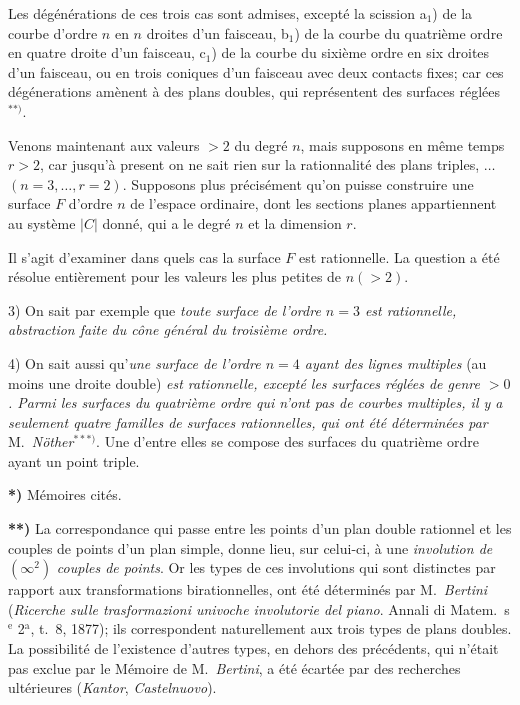 \documentclass{article}
\begin{document}
Les dégénérations de ces trois cas sont admises, excepté la scission a${}_{1}$) de la courbe d'ordre $n$ en $n$ droites d'un faisceau, b${}_{1}$) de la courbe du quatrième ordre en quatre droite d'un faisceau, c${}_{1}$) de la courbe du sixième ordre en six droites d'un faisceau, ou en trois coniques d'un faisceau avec deux contacts fixes; car ces dégénerations amènent à des plans doubles, qui représentent des surfaces réglées${}^{**)}$.

Venons maintenant aux valeurs $> 2$ du degré $n$, mais supposons en même temps $r > 2$, car jusqu'à present on ne sait rien sur la rationnalité des plans triples, $\ldots$ $(n = 3, \ldots, r = 2)$. Supposons plus précisément qu'on puisse construire une surface $F$ d'ordre $n$ de l'espace ordinaire, dont les sections planes appartiennent au système $|C|$ donné, qui a le degré $n$ et la dimension $r$.

Il s'agit d'examiner dans quels cas la surface $F$ est rationnelle. La question a été résolue entièrement pour les valeurs les plus petites de $n(> 2)$.

3) On sait par exemple que \emph{toute surface de l'ordre $n = 3$ est rationnelle, abstraction faite du cône général du troisième ordre.}

4) On sait aussi qu'\emph{une surface de l'ordre $n = 4$ ayant des lignes multiples} (au moins une droite double) \emph{est rationnelle, excepté les surfaces réglées de genre $> 0$. Parmi les surfaces du quatrième ordre qui n'ont pas de courbes multiples, il y a seulement quatre familles de surfaces rationnelles, qui ont été déterminées par} M.\ \emph{Nöther}${}^{***)}$. Une d'entre elles se compose des surfaces du quatrième ordre ayant un point triple.

\textbf{*)} Mémoires cités.

\textbf{**)} La correspondance qui passe entre les points d'un plan double rationnel et les couples de points d'un plan simple, donne lieu, sur celui-ci, à une \emph{involution de} $(\infty^{2})$ \emph{couples de points}. Or les types de ces involutions qui sont distinctes par rapport aux transformations birationnelles, ont été déterminés par M.\ \emph{Bertini} (\emph{Ricerche sulle trasformazioni univoche involutorie del piano}. Annali di Matem.\ s${}^{\text{e}}$ 2${}^{\text{a}}$, t.\ 8, 1877); ils correspondent naturellement aux trois types de plans doubles. La possibilité de l'existence d'autres types, en dehors des précédents, qui n'était pas exclue par le Mémoire de M.\ \emph{Bertini}, a été écartée par des recherches ultérieures (\emph{Kantor}, \emph{Castelnuovo}).
\end{document}
